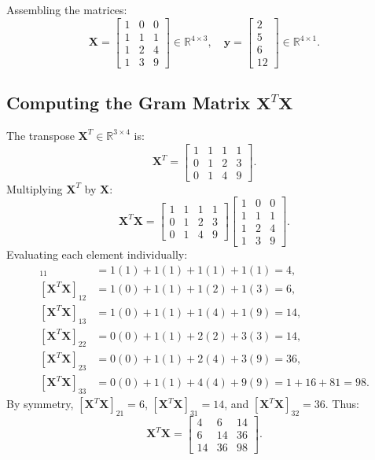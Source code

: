 \documentclass[11pt,a4paper]{article}
\numberwithin{equation}{section}
\newcommand{\RR}{\mathbb{R}}
\newcommand{\X}{\mathbf{X}}
\newcommand{\y}{\mathbf{y}}
\begin{document}
Assembling the matrices:
\begin{equation}
  \X = \begin{bmatrix}
    1 & 0 & 0 \\
    1 & 1 & 1 \\
    1 & 2 & 4 \\
    1 & 3 & 9
  \end{bmatrix} \in \RR^{4 \times 3}, \quad
  \y = \begin{bmatrix}
    2 \\ 5 \\ 6 \\ 12
  \end{bmatrix} \in \RR^{4 \times 1}.
\end{equation}

\subsection{Computing the Gram Matrix \texorpdfstring{$\X^T\X$}{X\textasciicircum T X}}
The transpose $\X^T \in \RR^{3 \times 4}$ is:
\begin{equation}
  \X^T = \begin{bmatrix}
    1 & 1 & 1 & 1 \\
    0 & 1 & 2 & 3 \\
    0 & 1 & 4 & 9
  \end{bmatrix}.
\end{equation}
Multiplying $\X^T$ by $\X$:
\begin{equation}
  \X^T\X = \begin{bmatrix}
    1 & 1 & 1 & 1 \\
    0 & 1 & 2 & 3 \\
    0 & 1 & 4 & 9
  \end{bmatrix}
  \begin{bmatrix}
    1 & 0 & 0 \\
    1 & 1 & 1 \\
    1 & 2 & 4 \\
    1 & 3 & 9
  \end{bmatrix}.
\end{equation}
Evaluating each element individually:
\begin{align*}
  [\X^T\X]_{11} &= 1(1) + 1(1) + 1(1) + 1(1) = 4, \\
  [\X^T\X]_{12} &= 1(0) + 1(1) + 1(2) + 1(3) = 6, \\
  [\X^T\X]_{13} &= 1(0) + 1(1) + 1(4) + 1(9) = 14, \\
  [\X^T\X]_{22} &= 0(0) + 1(1) + 2(2) + 3(3) = 14, \\
  [\X^T\X]_{23} &= 0(0) + 1(1) + 2(4) + 3(9) = 36, \\
  [\X^T\X]_{33} &= 0(0) + 1(1) + 4(4) + 9(9) = 1 + 16 + 81 = 98.
\end{align*}
By symmetry, $[\X^T\X]_{21} = 6$, $[\X^T\X]_{31} = 14$, and $[\X^T\X]_{32} = 36$. Thus:
\begin{equation}
  \boxed{\X^T\X = \begin{bmatrix}
    4 & 6 & 14 \\
    6 & 14 & 36 \\
    14 & 36 & 98
  \end{bmatrix}.}
\end{equation}
\end{document}
